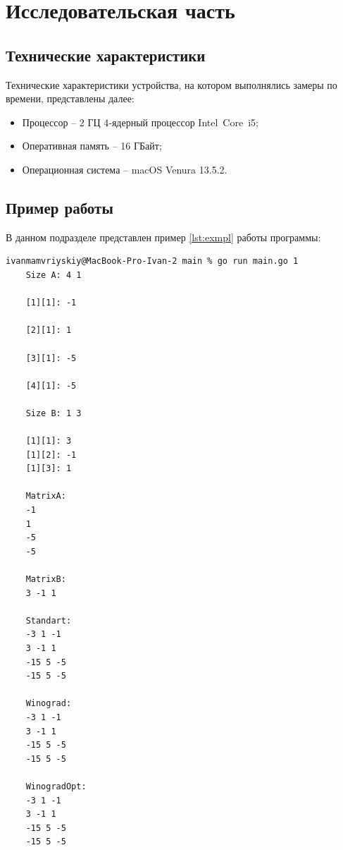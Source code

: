 \chapter{Исследовательская часть}

\section{Технические характеристики}

Технические характеристики устройства, на котором выполнялись замеры по времени, представлены далее:

\begin{itemize}
	\item Процессор -- 2 ГЦ 4‑ядерный процессор Intel Core i5;
	\item Оперативная память -- 16 ГБайт;
	\item Операционная система -- macOS Venura 13.5.2. 
\end{itemize}

\section{Пример работы}


В данном подразделе представлен пример \ref{lst:exmpl} работы программы: 

\begin{lstlisting}[label=lst:exmpl,caption=Демонстрация работы алгоритма]
    ivanmamvriyskiy@MacBook-Pro-Ivan-2 main % go run main.go 1
    Size A: 4 1

    [1][1]: -1

    [2][1]: 1

    [3][1]: -5

    [4][1]: -5

    Size B: 1 3

    [1][1]: 3
    [1][2]: -1
    [1][3]: 1

    MatrixA:
    -1 
    1 
    -5 
    -5 

    MatrixB:
    3 -1 1 

    Standart:
    -3 1 -1 
    3 -1 1 
    -15 5 -5 
    -15 5 -5 

    Winograd:
    -3 1 -1 
    3 -1 1 
    -15 5 -5 
    -15 5 -5 

    WinogradOpt:
    -3 1 -1 
    3 -1 1 
    -15 5 -5 
    -15 5 -5 
\end{lstlisting}

